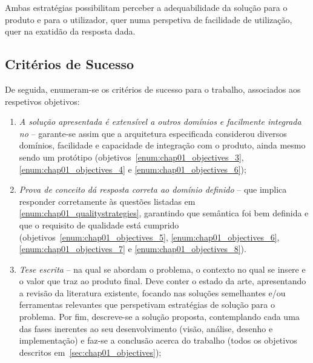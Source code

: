 Ambas estratégias possibilitam perceber a adequabilidade da solução para o produto e para o utilizador, quer numa perspetiva de facilidade de utilização, quer na exatidão da resposta dada.

\subsection{Critérios de Sucesso}

De seguida, enumeram-se os critérios de sucesso para o trabalho, associados aos respetivos objetivos:

\begin{enumerate}
    \item
    {
        \textit{A solução apresentada é extensível a outros domínios e facilmente integrada no {\productname}} -- garante-se assim que a arquitetura especificada considerou diversos domínios, facilidade e capacidade de integração com o produto, ainda mesmo sendo um protótipo (objetivos~\ref{enum:chap01_objectives_3}, \ref{enum:chap01_objectives_4} e \ref{enum:chap01_objectives_6});
    }
    \item
    {
        \textit{Prova de conceito dá resposta correta ao domínio definido} -- que implica responder corretamente às questões listadas em \ref{enum:chap01_qualitystrategies}, garantindo que semântica foi bem definida e que o requisito de qualidade está cumprido (objetivos~\ref{enum:chap01_objectives_5}, \ref{enum:chap01_objectives_6}, \ref{enum:chap01_objectives_7} e \ref{enum:chap01_objectives_8}).
    }
    \item 
    {
        \textit{Tese escrita} -- na qual se abordam o problema, o contexto no qual se insere e o valor que traz ao produto final. Deve conter o estado da arte, apresentando a revisão da literatura existente, focando nas soluções semelhantes e/ou ferramentas relevantes que perspetivam estratégias de solução para o problema. Por fim, descreve-se a solução proposta, contemplando cada uma das fases inerentes ao seu desenvolvimento (visão, análise, desenho e implementação) e faz-se a conclusão acerca do trabalho (todos os objetivos descritos em~\ref{sec:chap01_objectives});
    }
\end{enumerate}